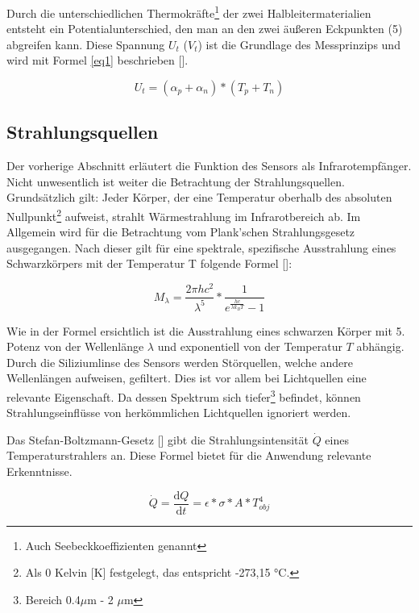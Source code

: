 Durch die unterschiedlichen Thermokräfte\footnote[3]{Auch Seebeckkoeffizienten genannt} der zwei Halbleitermaterialien entsteht ein Potentialunterschied, den man an den zwei äußeren Eckpunkten (5) abgreifen kann. Diese Spannung $U_{t}$ ($V_{t}$) ist die Grundlage des Messprinzips und wird mit Formel \ref{eq1} beschrieben [\protect\cite{AMG8834}].

\begin{equation}
\label{eq1}
U_{t} = (\alpha_{p} + \alpha_{n})*(T_{p}+T_{n})
\end{equation}

\subsection{Strahlungsquellen}
\label{subsec:Strahlungstheorie}
Der vorherige Abschnitt erläutert die Funktion des Sensors als Infrarotempfänger. Nicht unwesentlich ist weiter die Betrachtung der Strahlungsquellen. Grundsätzlich gilt: Jeder Körper, der eine Temperatur oberhalb des absoluten Nullpunkt\footnote[4]{Als 0 Kelvin [K] festgelegt, das entspricht -273,15 °C.} aufweist, strahlt Wärmestrahlung im Infrarotbereich ab. Im Allgemein wird für die Betrachtung vom Plank'schen Strahlungsgesetz ausgegangen. Nach dieser gilt für eine spektrale, spezifische Ausstrahlung eines Schwarzkörpers mit der Temperatur T folgende Formel [\protect\cite{Thermoformeln}]: 

\begin{equation}
\label{eq2}
M_{\lambda } = \frac{2\pi h c^2 }{\lambda^5}*\frac{1}{e^\frac{hc}{\lambda k_{B} T}-1}
\end{equation}

Wie in der Formel ersichtlich ist die Ausstrahlung eines schwarzen Körper mit 5. Potenz von der Wellenlänge $\lambda$ und exponentiell von der Temperatur $T$ abhängig. Durch die Siliziumlinse des Sensors werden Störquellen, welche andere Wellenlängen aufweisen, gefiltert. Dies ist vor allem bei Lichtquellen eine relevante Eigenschaft. Da dessen Spektrum sich tiefer\footnote[5]{Bereich 0.4$ \mu$m - 2 $\mu$m} befindet, können Strahlungseinflüsse von herkömmlichen Lichtquellen ignoriert werden.

Das Stefan-Boltzmann-Gesetz [\protect\cite{Thermoformeln}] gibt die Strahlungsintensität $\dot{Q}$ eines Temperaturstrahlers an. Diese Formel bietet für die Anwendung relevante Erkenntnisse.

\begin{equation}
\label{eq3}
\dot{Q} = \frac{\mathrm{d} Q}{\mathrm{d} t} = \epsilon *\sigma * A * T_{obj}^4
\end{equation}

